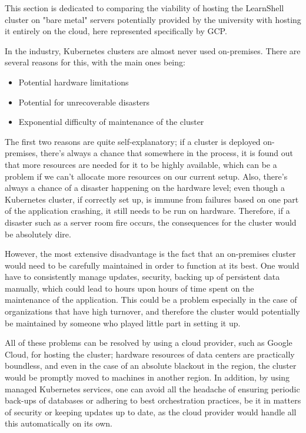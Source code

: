 \documentclass[thesis=B,english]{FITthesis}[2019/12/23]
\begin{document}
This section is dedicated to comparing the viability of hosting the LearnShell cluster on "bare metal" servers potentially provided by the university with hosting it entirely on the cloud, here represented specifically by GCP.

In the industry, Kubernetes clusters are almost never used on-premises. There are several reasons for this, with the main ones being:

\begin{itemize}
  \setlength\itemsep{0em}
  \item Potential hardware limitations
  \item Potential for unrecoverable disasters
  \item Exponential difficulty of maintenance of the cluster
\end{itemize}

The first two reasons are quite self-explanatory; if a cluster is deployed on-premises, there's always a chance that somewhere in the process, it is found out that more resources are needed for it to be highly available, which can be a problem if we can't allocate more resources on our current setup. Also, there's always a chance of a disaster happening on the hardware level; even though a Kubernetes cluster, if correctly set up, is immune from failures based on one part of the application crashing, it still needs to be run on hardware. Therefore, if a disaster such as a server room fire occurs, the consequences for the cluster would be absolutely dire.

However, the most extensive disadvantage is the fact that an on-premises cluster would need to be carefully maintained in order to function at its best. One would have to consistently manage updates, security, backing up of persistent data manually, which could lead to hours upon hours of time spent on the maintenance of the application. This could be a problem especially in the case of organizations that have high turnover, and therefore the cluster would potentially be maintained by someone who played little part in setting it up.

All of these problems can be resolved by using a cloud provider, such as Google Cloud, for hosting the cluster; hardware resources of data centers are practically boundless, and even in the case of an absolute blackout in the region, the cluster would be promptly moved to machines in another region. In addition, by using managed Kubernetes services, one can avoid all the headache of ensuring periodic back-ups of databases or adhering to best orchestration practices, be it in matters of security or keeping updates up to date, as the cloud provider would handle all this automatically on its own. \cite{cloud-native-kube}
\end{document}
